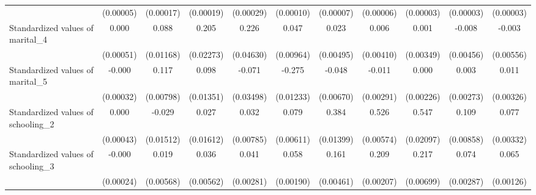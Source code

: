 {\begin{tabular}{l*{10}{c}}
                    &   (0.00005)         &   (0.00017)         &   (0.00019)         &   (0.00029)         &   (0.00010)         &   (0.00007)         &   (0.00006)         &   (0.00003)         &   (0.00003)         &   (0.00003)         \\
Standardized values of marital\_4&       0.000         &       0.088\sym{***}&       0.205\sym{***}&       0.226\sym{***}&       0.047\sym{***}&       0.023\sym{***}&       0.006         &       0.001         &      -0.008         &      -0.003         \\
                    &   (0.00051)         &   (0.01168)         &   (0.02273)         &   (0.04630)         &   (0.00964)         &   (0.00495)         &   (0.00410)         &   (0.00349)         &   (0.00456)         &   (0.00556)         \\
Standardized values of marital\_5&      -0.000         &       0.117\sym{***}&       0.098\sym{***}&      -0.071\sym{*}  &      -0.275\sym{***}&      -0.048\sym{***}&      -0.011\sym{***}&       0.000         &       0.003         &       0.011\sym{***}\\
                    &   (0.00032)         &   (0.00798)         &   (0.01351)         &   (0.03498)         &   (0.01233)         &   (0.00670)         &   (0.00291)         &   (0.00226)         &   (0.00273)         &   (0.00326)         \\
Standardized values of schooling\_2&       0.000         &      -0.029         &       0.027         &       0.032\sym{***}&       0.079\sym{***}&       0.384\sym{***}&       0.526\sym{***}&       0.547\sym{***}&       0.109\sym{***}&       0.077\sym{***}\\
                    &   (0.00043)         &   (0.01512)         &   (0.01612)         &   (0.00785)         &   (0.00611)         &   (0.01399)         &   (0.00574)         &   (0.02097)         &   (0.00858)         &   (0.00332)         \\
Standardized values of schooling\_3&      -0.000         &       0.019\sym{***}&       0.036\sym{***}&       0.041\sym{***}&       0.058\sym{***}&       0.161\sym{***}&       0.209\sym{***}&       0.217\sym{***}&       0.074\sym{***}&       0.065\sym{***}\\
                    &   (0.00024)         &   (0.00568)         &   (0.00562)         &   (0.00281)         &   (0.00190)         &   (0.00461)         &   (0.00207)         &   (0.00699)         &   (0.00287)         &   (0.00126)         \\

\end{tabular}}
